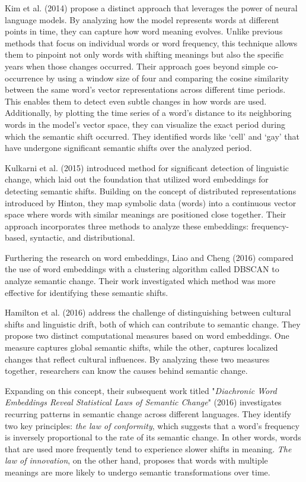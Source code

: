 \documentclass[12pt]{article}
\begin{document}
Kim et al. (2014) propose a distinct approach that leverages the power of neural language models.
By analyzing how the model represents words at different points in time, they can capture how word meaning evolves.
Unlike previous methods that focus on individual words or word frequency, this technique allows them to pinpoint not only words with shifting meanings but also the specific years when those changes occurred.
Their approach goes beyond simple co-occurrence by using a window size of four and comparing the cosine similarity between the same word's vector representations across different time periods.
This enables them to detect even subtle changes in how words are used.
Additionally, by plotting the time series of a word's distance to its neighboring words in the model's vector space, they can visualize the exact period during which the semantic shift occurred.
They identified words like {\lq{cell}\rq} and {\lq{gay}\rq} that have undergone significant semantic shifts over the analyzed period.

Kulkarni et al. (2015) introduced method for significant detection of linguistic change, which laid out the foundation that utilized word embeddings for detecting semantic shifts.
Building on the concept of distributed representations introduced by Hinton, they map symbolic data (words) into a continuous vector space where words with similar meanings are positioned close together.
Their approach incorporates three methods to analyze these embeddings: frequency-based, syntactic, and distributional.

Furthering the research on word embeddings, Liao and Cheng (2016) compared the use of word embeddings with a clustering algorithm called DBSCAN to analyze semantic change.
Their work investigated which method was more effective for identifying these semantic shifts.

Hamilton et al. (2016) address the challenge of distinguishing between cultural shifts and linguistic drift, both of which can contribute to semantic change.
They propose two distinct computational measures based on word embeddings.
One measure captures global semantic shifts, while the other, captures localized changes that reflect cultural influences.
By analyzing these two measures together, researchers can know the causes behind semantic change.

Expanding on this concept, their subsequent work titled "\textit{Diachronic Word Embeddings Reveal Statistical Laws of Semantic Change}" (2016) investigates recurring patterns in semantic change across different languages.
They identify two key principles: \textit{the law of conformity}, which suggests that a word's frequency is inversely proportional to the rate of its semantic change.
In other words, words that are used more frequently tend to experience slower shifts in meaning.
\textit{The law of innovation}, on the other hand, proposes that words with multiple meanings are more likely to undergo semantic transformations over time.
\end{document}
